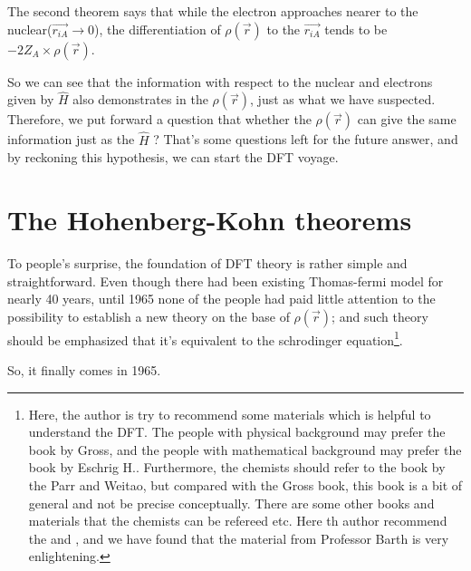 The second theorem says that while the electron approaches nearer to
the nuclear($\vec{r_{iA}}\rightarrow 0$), the differentiation of
$\rho(\vec{r})$ to the $\vec{r_{iA}}$ tends to be $-2Z_{A}\times
\rho(\vec{r})$.

So we can see that the information with respect to the nuclear and
electrons given by $\hat{H}$ also demonstrates in the $\rho(\vec{r})$,
just as what we have suspected. Therefore, we put forward a question
that whether the $\rho(\vec{r})$ can give the same information just as
the $\hat{H}$ ? That's some questions left for the future answer, and
by reckoning this hypothesis, we can start the DFT voyage.



\section{The Hohenberg-Kohn theorems}
%
%
%

To people's surprise, the foundation of DFT theory is rather simple
and straightforward. Even though there had been existing Thomas-fermi
model for nearly 40 years, until 1965 none of the people had paid
little attention to the possibility to establish a new theory on the
base of $\rho(\vec{r})$; and such theory should be emphasized that
it's equivalent to the schrodinger equation\footnote{Here, the author
  is try to recommend some materials which is helpful to understand
  the DFT. The people with physical background may prefer the book by
  Gross\cite{Gross_DFT}, and the people with mathematical background
  may prefer the book by Eschrig
  H.\cite{Fundamentals_of_Density_Functional_Theory}. Furthermore, the
  chemists should refer to the book by the Parr and
  Weitao\cite{weitaoYang}, but compared with the Gross book, this book
  is a bit of general and not be precise conceptually. There are some
  other books and materials that the chemists can be
  refereed\cite{argaman-1998, capelle-2002, RevModPhys.61.689, Koch,
    DFT_Basics_New_Trends_and_Applications,
    Density_Functional_Theory_I, Density_Functional_Theory_III}
  etc. Here th author recommend the \cite{Koch} and
  \cite{DFT_Basics_New_Trends_and_Applications}, and we have found
  that the material from Professor Barth\cite{2004PhST..109....9V} is
  very enlightening.}.

So, it finally comes in 1965\cite{HK1}.


